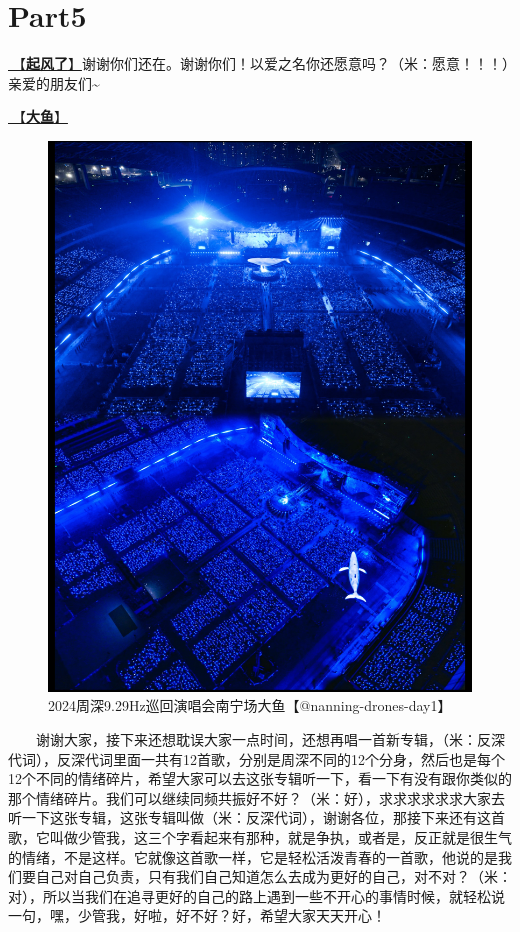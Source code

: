 \documentclass[]{ctexbook}
\begin{document}
\section{Part5}\label{nanning-20241206-part5}

\hyperref[the-wind-rises]{🎵【\textbf{起风了}】}谢谢你们还在。谢谢你们！以爱之名你还愿意吗？（米：愿意！！！）亲爱的朋友们\textasciitilde{}

\hyperref[big-fish]{🎵【\textbf{大鱼}】}

\begin{figure}

{\centering \includegraphics[width=400pt]{img/nanning20241206/004} 

}

\caption{2024周深9.29Hz巡回演唱会南宁场大鱼【@nanning-drones-day1】}\label{fig:unnamed-chunk-159}
\end{figure}

  谢谢大家，接下来还想耽误大家一点时间，还想再唱一首新专辑，（米：反深代词），反深代词里面一共有12首歌，分别是周深不同的12个分身，然后也是每个12个不同的情绪碎片，希望大家可以去这张专辑听一下，看一下有没有跟你类似的那个情绪碎片。我们可以继续同频共振好不好？（米：好），求求求求求求大家去听一下这张专辑，这张专辑叫做（米：反深代词），谢谢各位，那接下来还有这首歌，它叫做少管我，这三个字看起来有那种，就是争执，或者是，反正就是很生气的情绪，不是这样。它就像这首歌一样，它是轻松活泼青春的一首歌，他说的是我们要自己对自己负责，只有我们自己知道怎么去成为更好的自己，对不对？（米：对），所以当我们在追寻更好的自己的路上遇到一些不开心的事情时候，就轻松说一句，嘿，少管我，好啦，好不好？好，希望大家天天开心！
\end{document}
